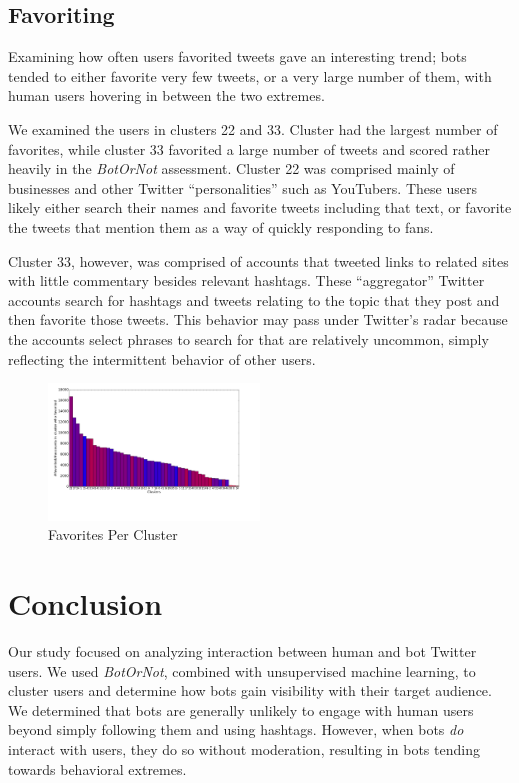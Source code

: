 \documentclass{sig-alternate-05-2015}
\begin{document}
\subsection{Favoriting}

Examining how often users favorited tweets gave an interesting trend; bots tended to either favorite very few tweets, or a very large number of them, with human users hovering in between the two extremes.

We examined the users in clusters 22 and 33. Cluster had the largest number of favorites, while cluster 33 favorited a large number of tweets and scored rather heavily in the \emph{BotOrNot} assessment. Cluster 22 was comprised mainly of businesses and other Twitter ``personalities'' such as YouTubers. These users likely either search their names and favorite tweets including that text, or favorite the tweets that mention them as a way of quickly responding to fans.

Cluster 33, however, was comprised of accounts that tweeted links to related sites with little commentary besides relevant hashtags. These ``aggregator'' Twitter accounts search for hashtags and tweets relating to the topic that they post and then favorite those tweets. This behavior may pass under Twitter's radar because the accounts select phrases to search for that are relatively uncommon, simply reflecting the intermittent behavior of other users.

\begin{figure}[h!]
	\caption{Favorites Per Cluster}
	\centering
		\includegraphics[width=0.5\textwidth]{imgs/favorites}
\end{figure}

\section{Conclusion}
Our study focused on analyzing interaction between human and bot Twitter users. We used \emph{BotOrNot}, combined with unsupervised machine learning, to cluster users and determine how bots gain visibility with their target audience. We determined that bots are generally unlikely to engage with human users beyond simply following them and using hashtags. However, when bots \emph{do} interact with users, they do so without moderation, resulting in bots tending towards behavioral extremes.
\end{document}
